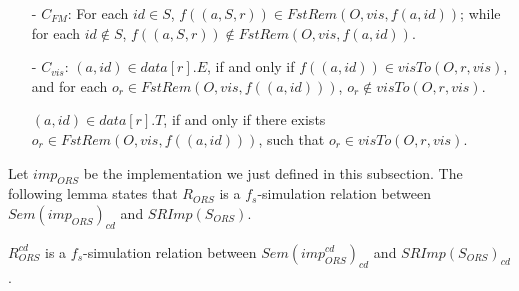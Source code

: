\begin{itemize}
\item[-] $C_{\mathit{FM}}$: For each $\mathit{id} \in S$, $f((a,S,r)) \in \mathit{FstRem}(O,\mathit{vis},f(a,\mathit{id}))$; while for each $\mathit{id} \notin S$, $f((a,S,r)) \notin \mathit{FstRem}(O,\mathit{vis},f(a,\mathit{id}))$.

\item[-] $C_{\mathit{vis}}$: $(a,\mathit{id}) \in data[r].E$, if and only if $f((a,\mathit{id})) \in \mathit{visTo}(O,r,\mathit{vis})$, and for each $o_r \in \mathit{FstRem}(O,\mathit{vis},f((a,\mathit{id})))$, $o_r \notin \mathit{visTo}(O,r,\mathit{vis})$. 
    
    $(a,\mathit{id}) \in data[r].T$, if and only if there exists $o_r \in \mathit{FstRem}(O,\mathit{vis},f((a,\mathit{id})))$, such that $o_r \in \mathit{visTo}(O,r,\mathit{vis})$. 
\end{itemize}

Let $\mathit{imp}_{\mathit{ORS}}$ be the implementation we just defined in this subsection. The following lemma states that $R_{\mathit{ORS}}$ is a $f_s$-simulation relation between $\mathit{Sem}( \mathit{imp}_{\mathit{ORS}} )_{\mathit{cd}}$ and $\mathit{SRImp}(S_{\mathit{ORS}})$. 


\begin{lemma}
\label{lemma:ROrscd is a fs simulation between orset causal delivery algorithm and orset specification}
$R_{\mathit{ORS}}^{\mathit{cd}}$ is a $f_s$-simulation relation between $\mathit{Sem}( \mathit{imp}_{\mathit{ORS}}^{cd} )_{\mathit{cd}}$ and $\mathit{SRImp}(S_{\mathit{ORS}})_{\mathit{cd}}$.
\end{lemma}

